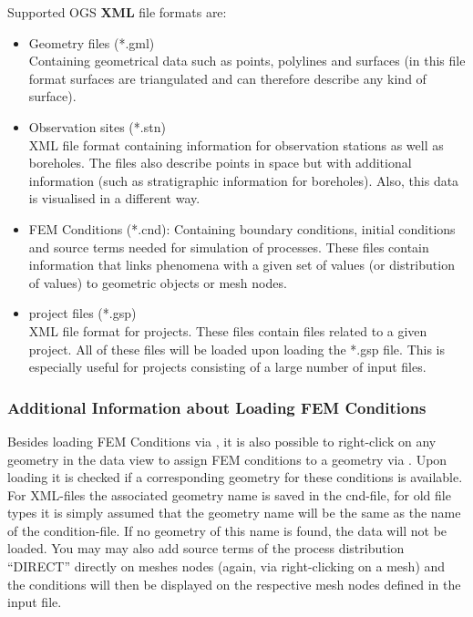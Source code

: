 Supported OGS \textbf{XML} file formats are:
\begin{itemize}
\item Geometry files (*.gml)\\
    Containing geometrical data such as points, polylines and surfaces (in this file format surfaces are triangulated and can therefore describe any kind of surface).
\item Observation sites (*.stn) \\
    XML file format containing information for observation stations as well as boreholes. The files also describe points in space but with additional information (such as stratigraphic information for boreholes). Also, this data is visualised in a different way.
\item FEM Conditions (*.cnd): Containing boundary conditions, initial conditions and source terms needed for simulation of processes. These files contain information that links phenomena with a given set of values (or distribution of values) to geometric objects or mesh nodes.
\item \ogs project files (*.gsp)\\
    XML file format for \ogs projects. These files contain files related to a given project. All of these files will be loaded upon loading the *.gsp file. This is especially useful for projects consisting of a large number of input files.
\end{itemize}

\subsubsection{Additional Information about Loading FEM Conditions}

Besides loading FEM Conditions via  , it is also possible to right-click on any geometry in the data view to assign FEM conditions to a geometry via . Upon loading it is checked if a corresponding geometry for these conditions is available. For XML-files the associated geometry name is saved in the cnd-file, for old file types it is simply assumed that the geometry name will be the same as the name of the condition-file. If no geometry of this name is found, the data will not be loaded. You may may also add source terms of the process distribution ``DIRECT'' directly on meshes nodes (again, via right-clicking on a mesh) and the conditions will then be displayed on the respective mesh nodes defined in the input file.

